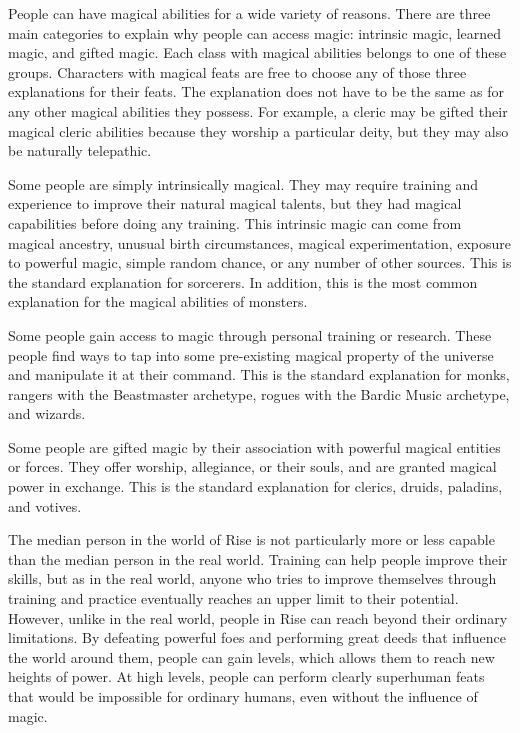   People can have magical abilities for a wide variety of reasons.
  There are three main categories to explain why people can access magic: intrinsic magic, learned magic, and gifted magic.
  Each class with magical abilities belongs to one of these groups.
  Characters with magical feats are free to choose any of those three explanations for their feats.
  The explanation does not have to be the same as for any other magical abilities they possess.
  For example, a cleric may be gifted their magical cleric abilities because they worship a particular deity, but they may also be naturally telepathic.

  Some people are simply intrinsically magical.
  They may require training and experience to improve their natural magical talents, but they had magical capabilities before doing any training.
  This intrinsic magic can come from magical ancestry, unusual birth circumstances, magical experimentation, exposure to powerful magic, simple random chance, or any number of other sources.
  This is the standard explanation for sorcerers.
  In addition, this is the most common explanation for the magical abilities of monsters.

  Some people gain access to magic through personal training or research.
  These people find ways to tap into some pre-existing magical property of the universe and manipulate it at their command.
  This is the standard explanation for monks, rangers with the Beastmaster archetype, rogues with the Bardic Music archetype, and wizards.

  Some people are gifted magic by their association with powerful magical entities or forces.
  They offer worship, allegiance, or their souls, and are granted magical power in exchange.
  This is the standard explanation for clerics, druids, paladins, and votives.

  The median person in the world of Rise is not particularly more or less capable than the median person in the real world.
  Training can help people improve their skills, but as in the real world, anyone who tries to improve themselves through training and practice eventually reaches an upper limit to their potential.
  However, unlike in the real world, people in Rise can reach beyond their ordinary limitations.
  By defeating powerful foes and performing great deeds that influence the world around them, people can gain levels, which allows them to reach new heights of power.
  At high levels, people can perform clearly superhuman feats that would be impossible for ordinary humans, even without the influence of magic.

